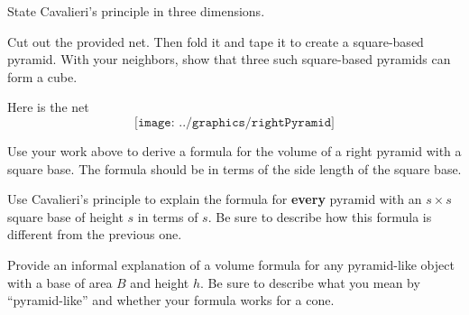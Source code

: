 \begin{prob}
State Cavalieri's principle in three dimensions.  
\end{prob}
\vspace{.25in}


%
%
%

\begin{prob}
Cut out the provided net.  Then fold it and tape it to create a square-based pyramid.  With your neighbors, show that three such square-based pyramids can form a cube.  
\end{prob}
\begin{teachingnote}
Here is the net
$$\texttt{[image: ../graphics/rightPyramid]}$$
\end{teachingnote}

\begin{prob}
Use your work above to derive a formula for the volume of a
right pyramid with a square base. The formula should be in terms of
the side length of the square base.
\end{prob}

\begin{prob}
Use Cavalieri's principle to explain the formula for \textbf{every} pyramid with an $s\times s$ square base of height $s$ in terms of $s$.  Be sure to describe how this formula is different from the previous one.  
\end{prob}

\begin{prob}
Provide an informal explanation of a volume formula for any pyramid-like object with a base of area $B$ and height $h$.  Be sure to describe what you mean by ``pyramid-like'' and whether your formula works for a cone.  
\end{prob}

